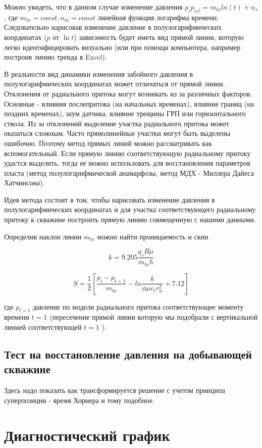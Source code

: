 Можно увидеть, что в данном случае изменение давления $p_i p_{wf} = m_{ln} ln(t) + n_s$, где $m_{ln} = const, n_{ln}=const$  линейная функция логарифма времени. Следовательно нарисовав изменение давление в полулогарифмических координатах ($p$ от $\ln{t}$) зависимость будет иметь вид прямой линии, которую легко идентифицировать визуально (или при помощи компьютера, например построив линию тренда в Excel).


В реальности вид динамики изменения забойного давления в полулогарифмических координатах может отличаться от прямой линии. Отклонения от радиального притока могут возникать из за различных факторов. Основные - влияния послепритока (на начальных временах), влияние границ (на поздних временах), шум датчика, влияние трещины ГРП или горизонтального ствола. 
Из за отклонений выделение участка радиального притока может оказаться сложным. Часто прямолинейные участки могут быть выделены ошибочно.  Поэтому метод прямых линий можно рассматривать как вспомогательный. 
Если прямую линию соответствующую радиальному притоку удастся выделить, тогда ее можно использовать для восстановления параметров пласта (метод полулогарифмической анамарфозы, метод МДХ - Миллера Дайеса Хатчинсона). 

Идея метода состоит в том, чтобы нарисовать изменение давления в полулогарифмических координатах и для участка соответствующего радиальному притоку к скважине построить прямую линию совмещенную с нашими данными.


Определив наклон линии $m_{ln}$  можно найти проницаемость и скин

$$ k=9.205\frac{q_s B \mu}{m_{ln} h} $$

$$ S = \frac{1}{2} \left[ \frac{ p_i - p_{t=1} }{m_{ln}} - ln{ \frac{k}{\phi \mu c_t r_w^2} +7.12}  \right]$$

где $p_{t=1}$ давление по модели радиального притока соответствующее моменту времени $t=1$ (пересечение прямой линии которую мы подобрали с вертикальной линией соответствующей $t=1$ ).


\subsection{Тест на восстановление давления на добывающей скважине}

Здесь надо показать как трансформируется решение с учетом принципа суперпозиции - время Хорнера и тому подобное.

\section{Диагностический график}

